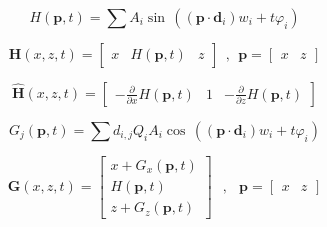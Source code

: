 \begin{equation} \label{eq:sum_of_sine_waves}
    H(\mathbf{p},t) = \sum{
        A_i \sin \, (
            (\mathbf{p} \cdot \mathbf{d}_i) w_i
            + t \varphi_i
        )
    }
\end{equation}

\begin{equation} \label{eq:sum_of_sine_waves_position}
    \mathbf{H}(x,z,t) = \begin{bmatrix}
        x&
        H(\mathbf{p},t)&
        z
    \end{bmatrix}\;\,,\;\,
    \mathbf{p} = \begin{bmatrix}
        x&z
    \end{bmatrix}
\end{equation}

\begin{equation} \label{eq:sum_of_sine_waves_normal}
    \mathbf{\hat{H}}(x,z,t) = \begin{bmatrix}
        -\frac{\partial}{\partial x} H(\mathbf{p},t)&
        1&
        -\frac{\partial}{\partial z} H(\mathbf{p},t)
    \end{bmatrix}
\end{equation}

\begin{equation} \label{eq:gerstner_wave}
    G_j(\mathbf{p},t) = \sum{
        d_{i,j} Q_iA_i \cos \, (
        (\mathbf{p} \cdot \mathbf{d}_i) w_i
        + t \varphi_i
        )
    }
\end{equation}

\begin{equation} \label{eq:gerstner_wave_position}
    \mathbf{G}(x,z,t) = \begin{bmatrix}
        x + G_x(\mathbf{p},t)\\
        H(\mathbf{p},t)\\
        z + G_z(\mathbf{p},t)
    \end{bmatrix}\;\;\,,\;\;\,
    \mathbf{p} = \begin{bmatrix}
        x&z
    \end{bmatrix}
\end{equation}

\begin{equation} \label{eq:gerstner_wave_normal}
\end{equation}

